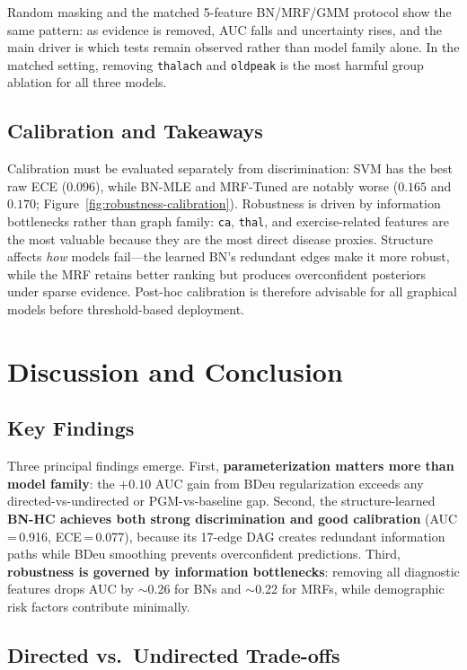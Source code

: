\documentclass{article}
\begin{document}
Random masking and the matched 5-feature BN/MRF/GMM protocol show the same pattern: as evidence is removed, AUC falls and uncertainty rises, and the main driver is which tests remain observed rather than model family alone. In the matched setting, removing \texttt{thalach} and \texttt{oldpeak} is the most harmful group ablation for all three models.

\subsection{Calibration and Takeaways}

Calibration must be evaluated separately from discrimination: SVM has the best raw ECE ($0.096$), while BN-MLE and MRF-Tuned are notably worse ($0.165$ and $0.170$; Figure~\ref{fig:robustness-calibration}). Robustness is driven by information bottlenecks rather than graph family: \texttt{ca}, \texttt{thal}, and exercise-related features are the most valuable because they are the most direct disease proxies. Structure affects \emph{how} models fail---the learned BN's redundant edges make it more robust, while the MRF retains better ranking but produces overconfident posteriors under sparse evidence. Post-hoc calibration is therefore advisable for all graphical models before threshold-based deployment.


\section{Discussion and Conclusion}

\subsection{Key Findings}

Three principal findings emerge. First, \textbf{parameterization matters more than model family}: the $+0.10$ AUC gain from BDeu regularization exceeds any directed-vs-undirected or PGM-vs-baseline gap. Second, the structure-learned \textbf{BN-HC achieves both strong discrimination and good calibration} (AUC\,=\,0.916, ECE\,=\,0.077), because its 17-edge DAG creates redundant information paths while BDeu smoothing prevents overconfident predictions. Third, \textbf{robustness is governed by information bottlenecks}: removing all diagnostic features drops AUC by $\sim$0.26 for BNs and $\sim$0.22 for MRFs, while demographic risk factors contribute minimally.

\subsection{Directed vs.\ Undirected Trade-offs}
\end{document}
